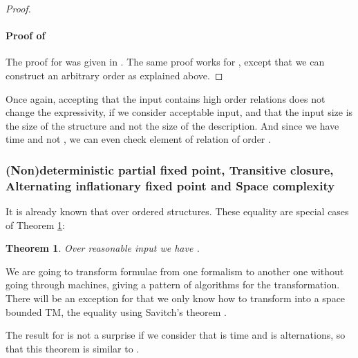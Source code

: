\documentclass[a4paper,12pt]{article}
\newcommand{\sss}[1]{\subsubsection{#1}}
\newtheorem{theorem}{Theorem}[section]
\theoremstyle{definition}
\begin{document}
\begin{proof}
 \paragraph{ Proof of
   }
 The proof for  was given in \cite{nfp}. The same proof works for
 , except that we can construct an arbitrary order as explained
 above. 





\end{proof}

Once again, accepting that the input contains high order relations does
not change the expressivity, if we consider acceptable input, and that the
input size is the size of the structure and not the size of the
description. And since we have time  and not
, we can even check element of relation of
order .

\sss{(Non)deterministic partial fixed point, Transitive
  closure, Alternating inflationary fixed point and Space complexity}
It is already known that
 over ordered
structures. These equality are special cases of  Theorem
\ref{space}:
\begin{theorem}\label{space}
  Over reasonable input we have  .
\end{theorem}
We are going  to transform formulae from one
formalism to another one without going through machines, giving a
pattern of algorithms for the transformation.
There will be an exception for  that we only know how
to transform into a space bounded TM, the equality using Savitch's
theorem \cite{Savitch}.

The result for  is not a surprise if we consider that  is
time and  is alternations, so that this theorem is similar to
.
\end{document}
